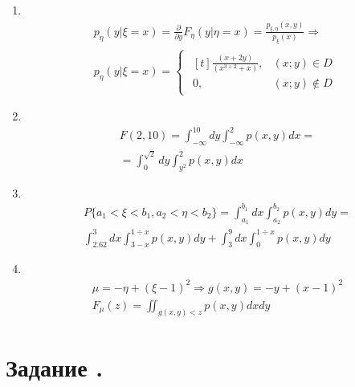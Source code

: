 \documentclass[12pt]{article}
\begin{document}
\begin{enumerate}
	\item \mbox{}\\
	      \begin{gather*}
		      p_{\eta}(y|\xi = x) = \frac{\partial}{\partial y}F_{\eta}(y|\eta = x)
		      = \frac{p_{\xi, \eta}(x, y)}{p_{\xi}(x)} \Rightarrow \\
		      p_{\eta}(y|\xi = x) =
		      \begin{cases}
			      \begin{aligned}[t]
				      \frac{(x + 2y)}{(x^{3\div2} + x)}, & (x;y) \in D \\
				      0,                                 & (x;y) \notin D
			      \end{aligned}
		      \end{cases}
	      \end{gather*}

	\item \mbox{}\\
	      \begin{gather*}
		      F(2,10) = \int_{-\infty}^{10}dy\int_{-\infty}^{2}p(x, y)dx = \\
		      = \int_{0}^{\sqrt{2}}dy\int_{y^2}^{2}p(x, y)dx
	      \end{gather*}

	\item \mbox{}\\
	      \begin{gather*}
		      P\{a_1 < \xi < b_1, a_2 < \eta < b_2\} = \int_{a_1}^{b_1}dx\int_{a_2}^{b_2}p(x, y)dy = \\
		      \int_{2.62}^{3}dx\int_{3 - x}^{1\div{x}}p(x, y)dy +
		      \int_{3}^{9}dx\int_{0}^{1\div{x}}p(x, y)dy
	      \end{gather*}

	\item \mbox{}\\
	      \begin{gather*}
		      \mu = -\eta + (\xi - 1)^2 \Rightarrow g(x, y) = -y + (x - 1)^2 \\
		      F_{\mu}(z) = \iint_{g(x, y) < z} p(x,y)dxdy
	      \end{gather*}

\end{enumerate}

\section*{Задание .}
\end{document}
